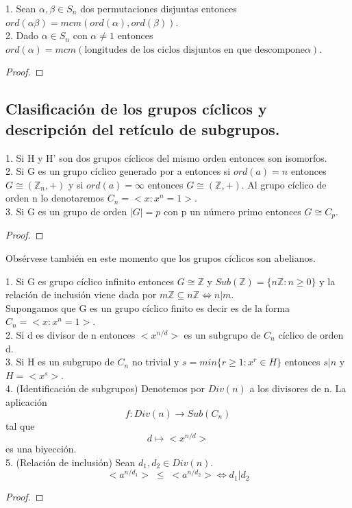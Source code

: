 \begin{proposition}
1. Sean $\alpha,\beta \in S_n$ dos permutaciones disjuntas entonces $ord(\alpha\beta) = mcm(ord(\alpha),ord(\beta))$.\\
2. Dado $\alpha \in S_n$ con $\alpha \neq 1$ entonces $ord(\alpha) = mcm(\text{longitudes de los ciclos disjuntos en que descompone} \alpha)$.
\end{proposition}
\begin{proof}

\end{proof}

\subsection{Clasificación de los grupos cíclicos y descripción del retículo de subgrupos.}

\begin{theorem}
1. Si H y H' son dos grupos cíclicos del mismo orden entonces son isomorfos.\\
2. Si G es un grupo cíclico generado por a entonces si $ord(a) = n$ entonces $G \cong (\mathbb{Z}_n,+)$ y si $ord(a) = \infty$ entonces $G \cong (\mathbb{Z},+)$. Al grupo cíclico de orden n lo denotaremos $C_n = <x:x^n = 1>$.\\
3. Si G es un grupo de orden $|G| = p$ con p un número primo entonces $G \cong C_p$.
\end{theorem}
\begin{proof}

\end{proof}

Obsérvese también en este momento que los grupos cíclicos son abelianos.

\begin{theorem}
1. Si G es grupo cíclico infinito entonces $G \cong \mathbb{Z}$ y $Sub(\mathbb{Z}) = \{n\mathbb{Z}:n \ge 0\}$ y la relación de inclusión viene dada por $m\mathbb{Z} \subseteq n\mathbb{Z} \iff n|m$. \\
Supongamos que G es un grupo cíclico finito es decir es de la forma $C_n = <x:x^n = 1>$.\\
2. Si d es divisor de n entonces $<x^{n/d}>$ es un subgrupo de $C_n$ cíclico de orden d. \\
3. Si H es un subgrupo de $C_n$ no trivial y $s = min\{r \ge 1:x^r \in H\}$ entonces $s|n$ y $H = <x^s>$. \\
4. (Identificación de subgrupos) Denotemos por $Div(n)$ a los divisores de n. La aplicación $$f:Div(n) \rightarrow Sub(C_n)$$ tal que $$d \mapsto <x^{n/d}>$$ es una biyección.  \\
5. (Relación de inclusión) Sean $d_1,d_2 \in Div(n)$. $$<a^{n/d_1}> \; \le \; <a^{n/d_2}> \iff d_1|d_2$$ 
\end{theorem}
\begin{proof}

\end{proof}